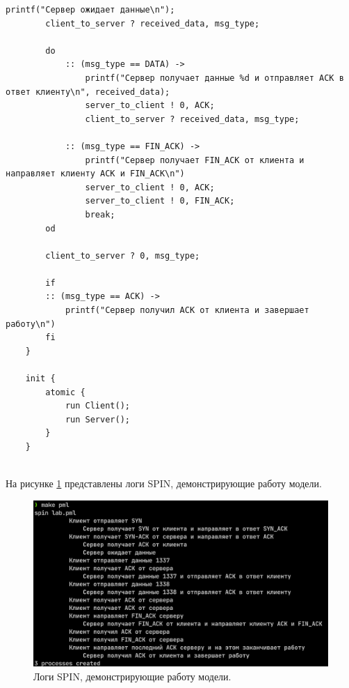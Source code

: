 \begin{lstlisting}[label=lst:1,caption=Описание модели взаимодействия процессов.]
		printf("Сервер ожидает данные\n");
		client_to_server ? received_data, msg_type;
	
		do
			:: (msg_type == DATA) ->
				printf("Сервер получает данные %d и отправляет ACK в ответ клиенту\n", received_data);
				server_to_client ! 0, ACK;
				client_to_server ? received_data, msg_type;
	
			:: (msg_type == FIN_ACK) ->
				printf("Сервер получает FIN_ACK от клиента и направляет клиенту ACK и FIN_ACK\n")
				server_to_client ! 0, ACK;
				server_to_client ! 0, FIN_ACK;
				break;
		od
	
		client_to_server ? 0, msg_type;
	
		if
		:: (msg_type == ACK) ->
			printf("Сервер получил ACK от клиента и завершает работу\n")
		fi
	}
	
	init {
		atomic {
			run Client();
			run Server();
		}
	}
	
\end{lstlisting}

На рисунке \ref{img:2} представлены логи SPIN, демонстрирующие работу модели.

\begin{figure}[H]
	\centering
	\includegraphics[width=\textwidth]{inc/2.png}
	\caption{ Логи SPIN, демонстрирующие работу модели. }
	\label{img:2}
\end{figure}

\pagebreak
